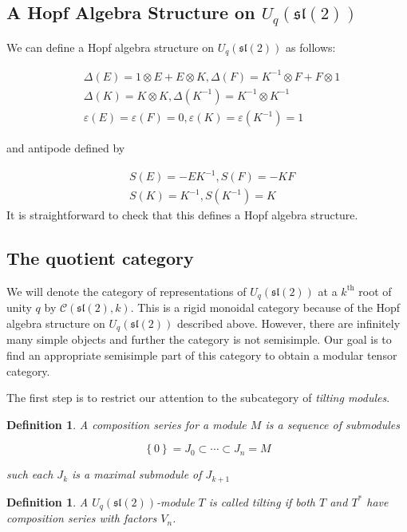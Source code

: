 \documentclass[]{article}
\newtheorem{defn}[theorem]{Definition}
\numberwithin{equation}{subsection}
\begin{document}
\subsection{A Hopf Algebra Structure on $U_q(\mathfrak{sl}(2))$}

We can define a Hopf algebra structure on $U_q(\mathfrak{sl}(2))$ as follows:

\begin{align}
    &\Delta(E) = 1 \otimes E + E \otimes K, \Delta(F) = K^{-1} \otimes F + F \otimes 1 \\
    &\Delta(K) = K \otimes K, \Delta(K^{-1}) = K^{-1} \otimes K^{-1}\\ 
    &\varepsilon(E) = \varepsilon(F) = 0, \varepsilon(K) = \varepsilon(K^{-1}) = 1
\end{align}

and antipode defined by 

\begin{align}
    & S(E) = -EK^{-1}, S(F) = -KF \\
    & S(K) = K^{-1}, S(K^{-1}) = K 
\end{align}
It is straightforward to check that this defines a Hopf algebra structure. 

\subsection{The quotient category}
We will denote the category of representations of $U_q(\mathfrak{sl}(2))$ at a
$k^\text{th}$ root of unity $q$ by $\mathcal{C}(\mathfrak{sl}(2), k)$. 
This is a rigid monoidal category because of the Hopf algebra structure on
$U_q(\mathfrak{sl}(2))$ described above. However, there are infinitely many
simple objects and further the category is not semisimple. Our goal is to find
an appropriate semisimple part of this category to obtain a modular tensor
category.

The first step is to restrict our attention to the subcategory of \emph{tilting modules}. 

\begin{defn}
    A \emph{composition series} for a module $M$ is a sequence of submodules 

    \begin{equation}
        \left\{ 0 \right\} = J_0 \subset \cdots \subset J_n = M
    \end{equation}

    such each $J_k$ is a maximal submodule of $J_{k+1}$
\end{defn}
\begin{defn}
    A $U_q(\mathfrak{sl}(2))$-module $T$ is called \emph{tilting} if both $T$ and $T^*$ have composition series with factors $V_n$.
\end{defn}
\end{document}
